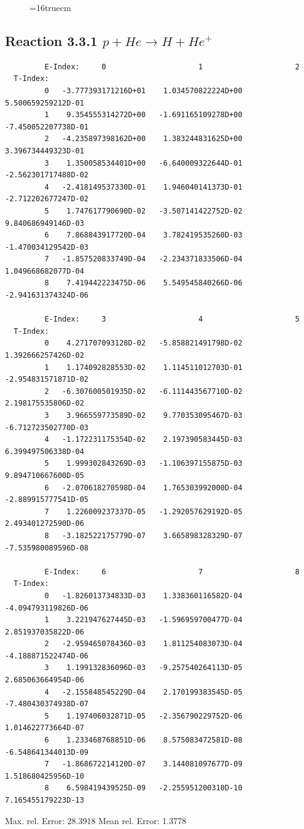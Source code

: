 \documentclass[12pt,dvips]{article}
\begin{document}
\begin{figure} \label{3.2.3b}
\epsfxsize=16truecm
\end{figure}
\newpage


\subsection{
Reaction 3.3.1  $  p + He \rightarrow H + He^+  $
}


\begin{small}\begin{verbatim}
         E-Index:     0                     1                     2
  T-Index:
         0   -3.777393171216D+01    1.034570822224D+00    5.500659259212D-01
         1    9.354555314272D+00   -1.691165109278D+00   -7.450052207738D-01
         2   -4.235897398162D+00    1.383244831625D+00    3.396734449323D-01
         3    1.350058534401D+00   -6.640009322644D-01   -2.562301717488D-02
         4   -2.418149537330D-01    1.946040141373D-01   -2.712202677247D-02
         5    1.747617790690D-02   -3.507141422752D-02    9.840686949146D-03
         6    7.868843917720D-04    3.782419535260D-03   -1.470034129542D-03
         7   -1.857520833749D-04   -2.234371833506D-04    1.049668682077D-04
         8    7.419442223475D-06    5.549545840266D-06   -2.941631374324D-06

         E-Index:     3                     4                     5
  T-Index:
         0    4.271707093128D-02   -5.858821491798D-02    1.392666257426D-02
         1    1.174092828553D-02    1.114511012703D-01   -2.954831571871D-02
         2   -6.307600501935D-02   -6.111443567710D-02    2.198175535806D-02
         3    3.966559773589D-02    9.770353095467D-03   -6.712723502770D-03
         4   -1.172231175354D-02    2.197390583445D-03    6.399497506338D-04
         5    1.999302843269D-03   -1.106397155875D-03    9.894710667600D-05
         6   -2.070618270598D-04    1.765303992000D-04   -2.889915777541D-05
         7    1.226009237337D-05   -1.292057629192D-05    2.493401272590D-06
         8   -3.182522175779D-07    3.665898328329D-07   -7.535980089596D-08

         E-Index:     6                     7                     8
  T-Index:
         0   -1.826013734833D-03    1.338360116582D-04   -4.094793119826D-06
         1    3.221947627445D-03   -1.596959700477D-04    2.851937035822D-06
         2   -2.959465078436D-03    1.811254083073D-04   -4.188871522474D-06
         3    1.199132836096D-03   -9.257540264113D-05    2.685063664954D-06
         4   -2.155848545229D-04    2.170199383545D-05   -7.480430374938D-07
         5    1.197406032871D-05   -2.356790229752D-06    1.014622773664D-07
         6    1.233468768851D-06    8.575083472581D-08   -6.548641344013D-09
         7   -1.868672214120D-07    3.144081097677D-09    1.518680425956D-10
         8    6.598419439525D-09   -2.255951200310D-10    7.165455179223D-13

\end{verbatim}\end{small}
  Max. rel. Error:  28.3918 %
  Mean rel. Error:   1.3778 %
\end{document}
